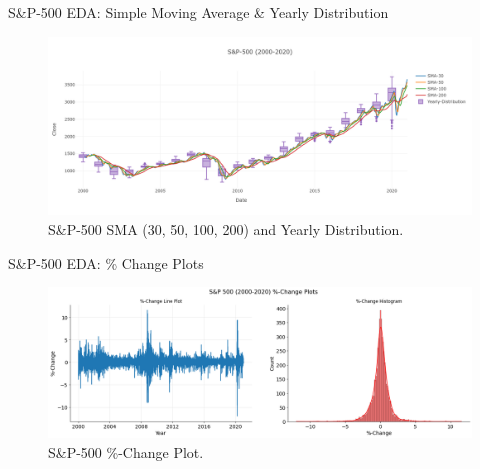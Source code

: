 \documentclass{beamer}
\begin{document}
\begin{frame}{S\&P-500 EDA: Simple Moving Average \& Yearly Distribution}
	\begin{figure}
		\centering
		\includegraphics[width = \textwidth]{images/S&P-500 Line-Plot-2}
		\caption{S\&P-500 SMA (30, 50, 100, 200) and Yearly Distribution.}
		\label{fig:my_label}
	\end{figure}
\end{frame}

\begin{frame}{S\&P-500 EDA: \% Change Plots}
	\begin{figure}
		\centering
		\includegraphics[width = \textwidth]{images/S&P-500 Change Plot.png}
		\caption{S\&P-500 \%-Change Plot.}
		\label{fig:my_label}
	\end{figure}
\end{frame}
\end{document}
